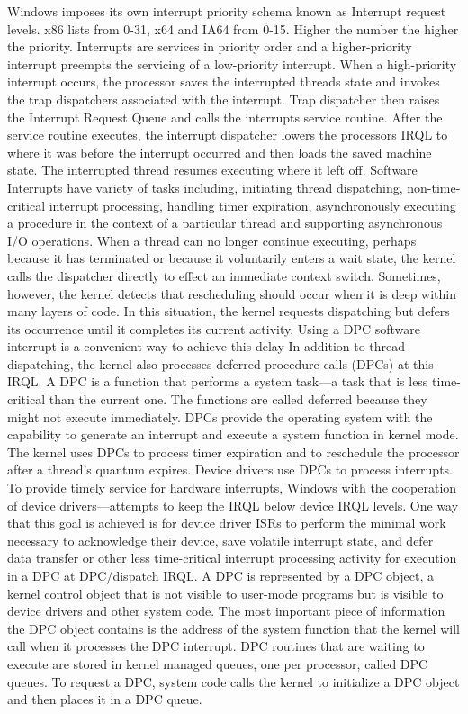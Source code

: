 \documentclass[letterpaper,10pt,draftclsnofoot,onecolumn]{IEEEtran}
\begin{document}
Windows imposes its own interrupt priority schema known as Interrupt request levels. x86 lists from 0-31, x64 and IA64 from 0-15. Higher the number the higher the priority. Interrupts are services in priority order and a higher-priority interrupt preempts the servicing of a low-priority interrupt. When a high-priority interrupt occurs, the processor saves the interrupted threads state and invokes the trap dispatchers associated with the interrupt. Trap dispatcher then raises the Interrupt Request Queue and calls the interrupts service routine. After the service routine executes, the interrupt dispatcher lowers the processors IRQL to where it was before the interrupt occurred and then loads the saved machine state. The interrupted thread resumes executing where it left off.
Software Interrupts have variety of tasks including, initiating thread dispatching, non-time-critical interrupt processing, handling timer expiration, asynchronously executing a procedure in the context of a particular thread and supporting asynchronous I/O operations.
When a thread can no longer continue executing, perhaps because it has terminated or because it voluntarily enters a wait state, the kernel calls the dispatcher directly to effect an immediate context switch. Sometimes, however, the kernel detects that rescheduling should occur when it is deep within many layers of code. In this situation, the kernel requests dispatching but defers its occurrence until it completes its current activity. Using a DPC software interrupt is a convenient way to achieve this delay
In addition to thread dispatching, the kernel also processes deferred procedure calls (DPCs) at this IRQL. A DPC is a function that performs a system task—a task that is less time-critical than the current one. The functions are called deferred because they might not execute immediately. DPCs provide the operating system with the capability to generate an interrupt and execute a system function in kernel mode. The kernel uses DPCs to process timer expiration and to reschedule the processor after a thread’s quantum expires. Device drivers use DPCs to process interrupts. To provide timely service for hardware interrupts, Windows with the cooperation of device drivers—attempts to keep the IRQL below device IRQL levels. One way that this goal is achieved is for device driver ISRs to perform the minimal work necessary to acknowledge their device, save volatile interrupt state, and defer data transfer or other less time-critical interrupt processing activity for execution in a DPC at DPC/dispatch IRQL.
A DPC is represented by a DPC object, a kernel control object that is not visible to user-mode programs but is visible to device drivers and other system code. The most important piece of information the DPC object contains is the address of the system function that the kernel will call when it processes the DPC interrupt. DPC routines that are waiting to execute are stored in kernel managed queues, one per processor, called DPC queues. To request a DPC, system code calls the kernel to initialize a DPC object and then places it in a DPC queue.\cite{[1]}
\end{document}
